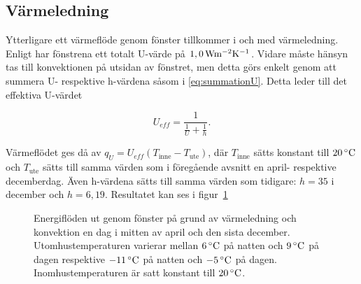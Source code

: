 \subsection{Värmeledning}

Ytterligare ett värmeflöde genom fönster tillkommer i och med värmeledning. Enligt \cite{petersarneo} har fönstrena ett totalt U-värde på $\unit[1,0]{Wm^{-2}K^{-1}}$. Vidare måste hänsyn tas till konvektionen på utsidan av fönstret, men detta görs enkelt genom att summera U- respektive h-värdena såsom i \ref{eq:summationU}. Detta leder till det effektiva U-värdet

\begin{equation}
U_{eff} = \frac{1}{\frac{1}{U} + \frac{1}{h}}.
\end{equation}

Värmeflödet ges då av $q_{U}=U_{eff} \left( T_\text{inne}-T_\text{ute} \right)$, där $T_\text{inne}$ sätts konstant till $\unit[20]{^{\circ}C}$ och $T_\text{ute}$ sätts till samma värden som i föregående avsnitt en april- respektive decemberdag. Även h-värdena sätts till samma värden som tidigare: $h=35$ i december och $h=6,19$. Resultatet kan ses i figur~\ref{fig:windowconduction}

\begin{figure}[hpbt]
\centering

\vspace{1cm}

\caption{\label{fig:windowconduction} Energiflöden ut genom fönster på grund av värmeledning och konvektion en dag i mitten av april och den sista december.
Utomhustemperaturen varierar mellan $\unit[6]{^\circ C}$ på natten och $\unit[9]{^\circ C}$ på dagen respektive $\unit[-11]{^\circ C}$ på natten och $\unit[-5]{^\circ C}$ på dagen. Inomhustemperaturen är satt konstant till $\unit[20]{^\circ C}$.}
\end{figure}
